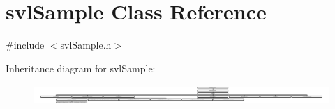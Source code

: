 \hypertarget{classsvl_sample}{}\section{svl\+Sample Class Reference}
\label{classsvl_sample}


{\ttfamily \#include $<$svl\+Sample.\+h$>$}

Inheritance diagram for svl\+Sample\+:\begin{figure}[H]
\begin{center}
\leavevmode
\includegraphics[height=0.785965cm]{dd/d7c/classsvl_sample}
\end{center}
\end{figure}
